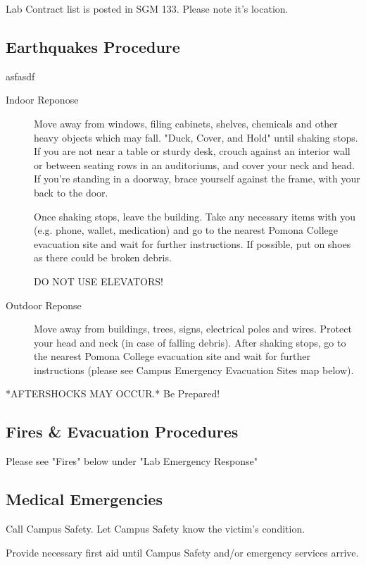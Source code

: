 \documentclass[12pt]{../SOP2}
\begin{document}
\NP Lab Contract list is posted in SGM 133. Please note it's location.

\subsection*{Earthquakes Procedure} 

\NP asfasdf

\begin{description}
  \item[Indoor Reponose] Move away from windows, filing cabinets, shelves, chemicals and other heavy objects which may fall. "Duck, Cover, and Hold" until shaking stops. If you are not near a table or sturdy desk, crouch against an interior wall or between seating rows in an auditoriums, and cover your neck and head. If you’re standing in a doorway, brace yourself against the frame, with your back to the door.

Once shaking stops, leave the building. Take any necessary items with you (e.g. phone, wallet, medication) and go to the nearest Pomona College evacuation site and wait for further instructions. If possible, put on shoes as there could be broken debris. 

DO NOT USE ELEVATORS!

\item[Outdoor Reponse] Move away from buildings, trees, signs, electrical poles and wires.
Protect your head and neck (in case of falling debris).
After shaking stops, go to the nearest Pomona College evacuation site and wait for further instructions (please see Campus Emergency Evacuation Sites map below).

\end{description}
	
	*AFTERSHOCKS MAY OCCUR.* Be Prepared!


\subsection*{Fires \& Evacuation Procedures}

Please see "Fires" below under "Lab Emergency Response"

\subsection{Medical Emergencies}

\NP Call Campus Safety. Let Campus Safety know the victim's condition. 

\NP Provide necessary first aid until Campus Safety and/or emergency services arrive.
\end{document}
